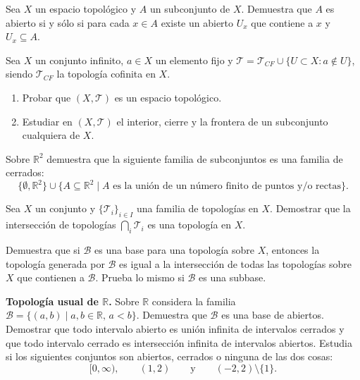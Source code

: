 \begin{ejer}[13]
Sea $X$ un espacio topológico y $A$ un subconjunto de $X$. Demuestra que $A$ es abierto si y sólo si para cada $x \in A$ existe un abierto $U_x$ que contiene a $x$ y $U_x \subseteq A$.
\end{ejer}

\begin{ejer}[14]
Sea $X$ un conjunto infinito, $a \in X$ un elemento fijo y $\mathcal{T} = \mathcal{T}_{CF} \cup \{U \subset X : a \notin U\}$, siendo $\mathcal{T}_{CF}$ la topología cofinita en $X$.
\begin{enumerate}
    \item[a)] Probar que $(X, \mathcal{T})$ es un espacio topológico.
    \item[b)] Estudiar en $(X, \mathcal{T})$ el interior, cierre y la frontera de un subconjunto cualquiera de $X$.
\end{enumerate}
\end{ejer}

\begin{ejer}[15]
Sobre $\mathbb{R}^2$ demuestra que la siguiente familia de subconjuntos es una familia de cerrados:
\[
    \{\emptyset, \mathbb{R}^2\} \cup \{A \subseteq \mathbb{R}^2 \mid A \text{ es la unión de un número finito de puntos y/o rectas}\}.
\]
\end{ejer}

\begin{ejer}[16]
Sea $X$ un conjunto y $\{\mathcal{T}_i\}_{i \in I}$ una familia de topologías en $X$. Demostrar que la intersección de topologías $\bigcap_i \mathcal{T}_i$ es una topología en $X$.
\end{ejer}

\begin{ejer}[17]
Demuestra que si $\mathcal{B}$ es una base para una topología sobre $X$, entonces la topología generada por $\mathcal{B}$ es igual a la intersección de todas las topologías sobre $X$ que contienen a $\mathcal{B}$. Prueba lo mismo si $\mathcal{B}$ es una subbase.
\end{ejer}

\begin{ejer}[18]
\textbf{Topología usual de $\mathbb{R}$.} Sobre $\mathbb{R}$ considera la familia $\mathcal{B} = \{(a,b) \mid a,b \in \mathbb{R}, \, a < b\}$. Demuestra que $\mathcal{B}$ es una base de abiertos. Demostrar que todo intervalo abierto es unión infinita de intervalos cerrados y que todo intervalo cerrado es intersección infinita de intervalos abiertos. Estudia si los siguientes conjuntos son abiertos, cerrados o ninguna de las dos cosas:
\[
    [0, \infty), \qquad (1,2) \qquad \text{y} \qquad (-2,2) \setminus \{1\}.
\]
\end{ejer}

